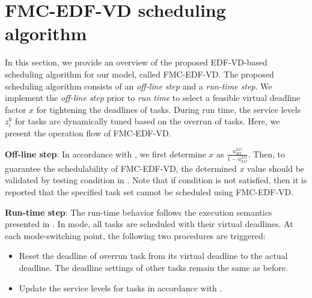 \documentclass[10pt,journal,compsoc]{IEEEtran}
\begin{document}
\section{FMC-EDF-VD scheduling algorithm}
\label{sec:overview}
In this section, we provide an overview of the proposed EDF-VD-based scheduling algorithm for our \FMC model, called FMC-EDF-VD. The proposed scheduling algorithm consists of an \textit{off-line step} and a \textit{run-time step}. We implement the \textit{off-line step} prior to \textit{run time} to select a feasible virtual deadline factor $x$ for tightening the deadlines of \hi tasks. During run time, the service levels $z_i^k$ for \lo tasks are dynamically tuned based on the overrun of \hi tasks. Here, we present the operation flow of FMC-EDF-VD.
    
\noindent\textbf{Off-line step}: In accordance with , we first determine $x$ as $\frac{u_{HI}^{LO}}{1-u_{LO}^{LO}}$. Then, to guarantee the schedulability of FMC-EDF-VD, the determined $x$ value should be validated by testing condition  in . Note that if condition  is not satisfied, then it is reported that the specified task set cannot be scheduled using FMC-EDF-VD.  
         
\noindent\textbf{Run-time step}: The run-time behavior follows the execution semantics presented in . In \lo mode, all \hi tasks are scheduled with their virtual deadlines. At each mode-switching point, the following two procedures are triggered:  
\begin{itemize}
\item Reset the deadline of overrun \hi task from its virtual deadline to the actual deadline. The deadline settings of other \hi tasks remain the same as before. 
\item Update the service levels for \lo tasks in accordance with .       
\end{itemize}
\end{document}
